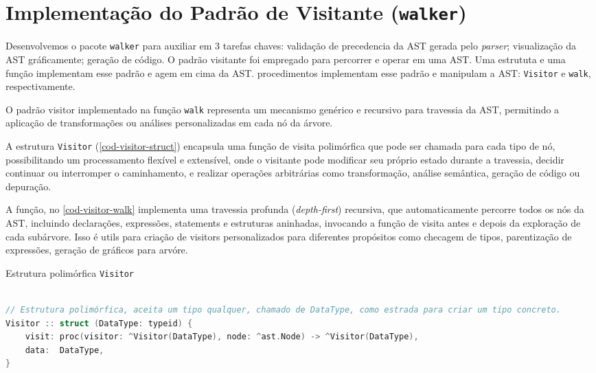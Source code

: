 
\section{Implementação do Padrão de Visitante (\texttt{walker})} \label{section-walker}

Desenvolvemos o pacote \texttt{walker} para auxiliar em 3 tarefas chaves: validação de precedencia da AST gerada pelo \textit{parser}; visualização da AST gráficamente; geração de código. O padrão visitante foi empregado para percorrer e operar em uma AST. Uma estrututa e uma função implementam esse padrão e agem em cima da AST. procedimentos implementam esse padrão e manipulam a AST: \texttt{Visitor} e \texttt{walk}, respectivamente.


O padrão visitor implementado na função \texttt{walk} representa um mecanismo genérico e recursivo para travessia da AST, permitindo a aplicação de transformações ou análises personalizadas em cada nó da árvore.

A estrutura \texttt{Visitor} (\autoref{cod-visitor-struct}) encapsula uma função de visita polimórfica que pode ser chamada para cada tipo de nó, possibilitando um processamento flexível e extensível, onde o visitante pode modificar seu próprio estado durante a travessia, decidir continuar ou interromper o caminhamento, e realizar operações arbitrárias como transformação, análise semântica, geração de código ou depuração.

A função, no \autoref{cod-visitor-walk} implementa uma travessia profunda (\textit{depth-first}) recursiva, que automaticamente percorre todos os nós da AST, incluindo declarações, expressões, statements e estruturas aninhadas, invocando a função de visita antes e depois da exploração de cada subárvore. Isso é utils para criação de visitors personalizados para diferentes propósitos como checagem de tipos, parentização de expressões, geração de gráficos para arvóre.


\begin{codigo}[htb]
    \caption{\small Estrutura polimórfica \texttt{Visitor}}
        \label{cod-visitor-struct}
\begin{lstlisting}[language = C]

// Estrutura polimórfica, aceita um tipo qualquer, chamado de DataType, como estrada para criar um tipo concreto.
Visitor :: struct (DataType: typeid) {
    visit: proc(visitor: ^Visitor(DataType), node: ^ast.Node) -> ^Visitor(DataType),
    data:  DataType,
}
\end{lstlisting}
\end{codigo}

